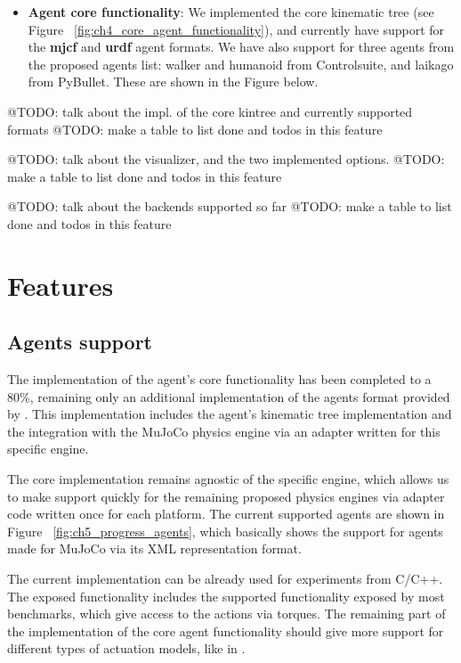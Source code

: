 \begin{itemize}
    \item \textbf{Agent core functionality}: We implemented the core kinematic 
            tree (see Figure ~\ref{fig:ch4_core_agent_functionality}), and currently
            have support for the \textbf{mjcf} and \textbf{urdf} agent formats.
            We have also support for three agents from the proposed agents list:
            walker and humanoid from Controlsuite, and laikago from PyBullet. These
            are shown in the Figure below.

            \figSupportedAgents

\end{itemize}

@TODO: talk about the impl. of the core kintree and currently supported formats
@TODO: make a table to list done and todos in this feature

@TODO: talk about the visualizer, and the two implemented options.
@TODO: make a table to list done and todos in this feature

@TODO: talk about the backends supported so far
@TODO: make a table to list done and todos in this feature

\section{Features}

\subsection*{Agents support}

The implementation of the agent's core functionality has been completed to a 80\%,
remaining only an additional implementation of the agents format provided by \cite{TerrainRLSim}.
This implementation includes the agent's kinematic tree implementation and the integration 
with the MuJoCo physics engine via an adapter written for this specific engine.

The core implementation remains agnostic of the specific engine, which allows us
to make support quickly for the remaining proposed physics engines via adapter code
written once for each platform. The current supported agents are shown in Figure ~\ref{fig:ch5_progress_agents},
which basically shows the support for agents made for MuJoCo via its XML representation format.

The current implementation can be already used for experiments from C/C++. The exposed
functionality includes the supported functionality exposed by most benchmarks, which
give access to the actions via torques. The remaining part of the implementation of the core
agent functionality should give more support for different types of actuation models, like in \cite{ActuationChoice}.

